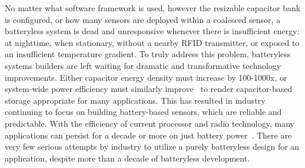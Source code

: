 No matter what software framework is used, however the resizable capacitor bank is configured, or how many sensors are deployed within a coalesced sensor, a batteryless system is dead and unresponsive whenever there is insufficient energy: at nighttime, when stationary, without a nearby RFID transmitter, or exposed to an insufficient temperature gradient.
To truly address this problem, batteryless systems builders are left waiting for dramatic and transformative technology improvements. Either capacitor energy density must increase by 100-1000x, or system-wide power efficiency must similarly improve~\cite{curtiss2021facebit} to render capacitor-based storage appropriate for many applications.
This has resulted in industry continuing to focus on building battery-based sensors, which are reliable and predictable.
With the efficiency of current processor and radio technology, many applications can persist for a decade or more on just battery power~\cite{emersonRosemount,GEInsightMesh,honeywellOneWireless}.
There are very few serious attempts by industry to utilize a purely batteryless design for an application, despite more than a decade of batteryless development.

